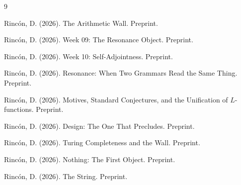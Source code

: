 \documentclass[12pt]{article}
\theoremstyle{definition}
\theoremstyle{remark}
\begin{document}
\begin{thebibliography}{9}

Rinc\'on, D. (2026).
The Arithmetic Wall. Preprint.

Rinc\'on, D. (2026).
Week 09: The Resonance Object. Preprint.

Rinc\'on, D. (2026).
Week 10: Self-Adjointness. Preprint.

Rinc\'on, D. (2026).
Resonance: When Two Grammars Read the Same Thing. Preprint.

Rinc\'on, D. (2026).
Motives, Standard Conjectures, and the Unification of $L$-functions.
Preprint.

Rinc\'on, D. (2026).
Design: The One That Precludes. Preprint.

Rinc\'on, D. (2026).
Turing Completeness and the Wall. Preprint.

Rinc\'on, D. (2026).
Nothing: The First Object. Preprint.

Rinc\'on, D. (2026).
The String. Preprint.

\end{thebibliography}
\end{document}

